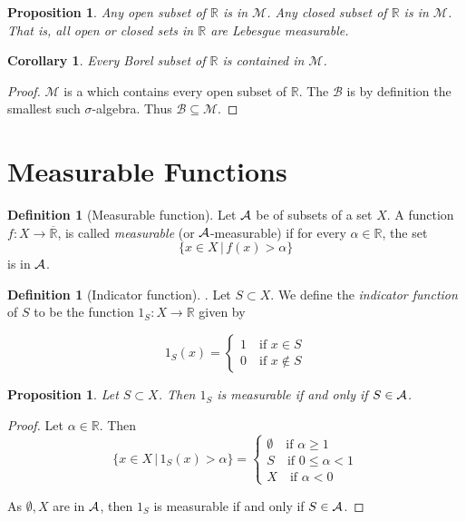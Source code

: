 \documentclass[10pt, oneside, reqno]{amsart}
\theoremstyle{plain}%
\newtheorem{prop}[thm]{Proposition}
\newtheorem*{cor}{Corollary}
\theoremstyle{definition}
\newtheorem{defn}[thm]{Definition}
\theoremstyle{remark}
\newcommand{\given}{ \, | \,}
\newcommand{\R}{\mathbb{R}}
\begin{document}
\begin{prop}
	Any open subset of $\R$ is in $\mathcal{M}$.  Any closed subset of $\R$ is in $\mathcal{M}$.  That is, all open or closed sets in $\R$ are Lebesgue measurable.
\end{prop}

\begin{cor}
	Every Borel subset of $\R$ is contained in $\mathcal{M}$.  
\end{cor}
\begin{proof}
	$\mathcal{M}$ is a \sig which contains every open subset of $\R$.  The \sig $\mathcal{B}$ is by definition the smallest such $\sigma$-algebra.  Thus $\mathcal{B} \subseteq \mathcal{M}$.
\end{proof}


\section{Measurable Functions} %
\label{sec:measurable_functions}
\newcommand{\Rbar}{\overline{\R}}

\begin{defn}[Measurable function]
	Let $\mathcal{A}$ be \sig of subsets of a set $X$.  A function $f: X \rightarrow \Rbar$, is called \emph{measurable} (or $\mathcal{A}$-measurable) if for every $\alpha \in \R$, the set \[
		\{ x \in X \given f(x) > \alpha \}
	\] is in $\mathcal{A}$.
\end{defn}

\begin{defn}[Indicator function].  Let $S \subset X$.  We define the \emph{indicator function} of $S$ to be the function $1_S : X \rightarrow \R$ given by 

	\[ 1_S(x) = \begin{cases}
		1 \quad \text{if $x \in S$}\\
		0 \quad \text{if $x \notin S$}
	\end{cases}\]
\end{defn}

\begin{prop}
	Let $S \subset X$.  Then $1_S$ is measurable if and only if $S \in \mathcal{A}$.  
\end{prop}
\begin{proof}
	Let $\alpha \in \R$.  Then \[
		\{ x \in X \given 1_S(x) > \alpha \} = \begin{cases}
			\emptyset \quad \text{if $\alpha \geq 1$}\\
			S \quad \text{if $0 \leq \alpha < 1$} \\
			X \quad \text{if $\alpha < 0$}
		\end{cases}
	\]
	
As $\emptyset, X$ are in $\mathcal{A}$, then $1_S$ is measurable if and only if $S \in \mathcal{A}$.
\end{proof}
\end{document}
